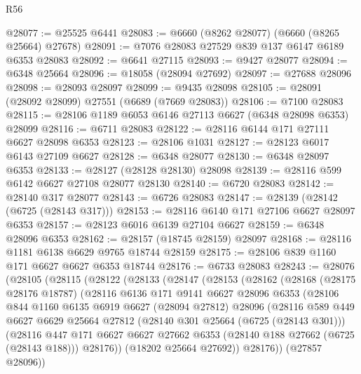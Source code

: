 \begin{lexlean}{R56}
\begin{coremodule}
@28077 := @25525 @6441
@28083 := @6660 (@8262 @28077) (@6660 (@8265 @25664) @27678)
@28091 := @7076 @28083 @27529 @839 @137 @6147 @6189 @6353 @28083
@28092 := @6641 @27115
@28093 := @9427 @28077
@28094 := @6348 @25664
@28096 := @18058 (@28094 @27692)
@28097 := @27688 @28096
@28098 := @28093 @28097
@28099 := @9435 @28098
@28105 := @28091 (@28092 @28099) @27551 (@6689 (@7669 @28083))
@28106 := @7100 @28083
@28115 := @28106 @1189 @6053 @6146 @27113 @6627 (@6348 @28098 @6353) @28099
@28116 := @6711 @28083
@28122 := @28116 @6144 @171 @27111 @6627 @28098 @6353
@28123 := @28106 @1031
@28127 := @28123 @6017 @6143 @27109 @6627
@28128 := @6348 @28077
@28130 := @6348 @28097 @6353
@28133 := @28127 (@28128 @28130) @28098
@28139 := @28116 @599 @6142 @6627 @27108 @28077 @28130
@28140 := @6720 @28083
@28142 := @28140 @317 @28077
@28143 := @6726 @28083
@28147 := @28139 (@28142 (@6725 (@28143 @317)))
@28153 := @28116 @6140 @171 @27106 @6627 @28097 @6353
@28157 := @28123 @6016 @6139 @27104 @6627
@28159 := @6348 @28096 @6353
@28162 := @28157 (@18745 @28159) @28097
@28168 := @28116 @1181 @6138 @6629 @9765 @18744 @28159
@28175 := @28106 @839 @1160 @171 @6627 @6627 @6353 @18744
@28176 := @6733 @28083
@28243 := @28076
    (@28105
      (@28115
        (@28122
          (@28133
            (@28147
              (@28153
                (@28162
                  (@28168
                    (@28175 @28176 @18787)
                    (@28116
                      @6136
                      @171
                      @9141
                      @6627
                      @28096
                      @6353
                      (@28106
                        @844
                        @1160
                        @6135
                        @6919
                        @6627
                        (@28094 @27812)
                        @28096
                        (@28116
                          @589
                          @449
                          @6627
                          @6629
                          @25664
                          @27812
                          (@28140 @301 @25664 (@6725 (@28143 @301)))
                          (@28116
                            @447
                            @171
                            @6627
                            @6627
                            @27662
                            @6353
                            (@28140 @188 @27662 (@6725 (@28143 @188)))
                            @28176))
                        (@18202 @25664 @27692))
                      @28176))
                  (@27857 @28096))

\end{coremodule}
\end{lexlean}
